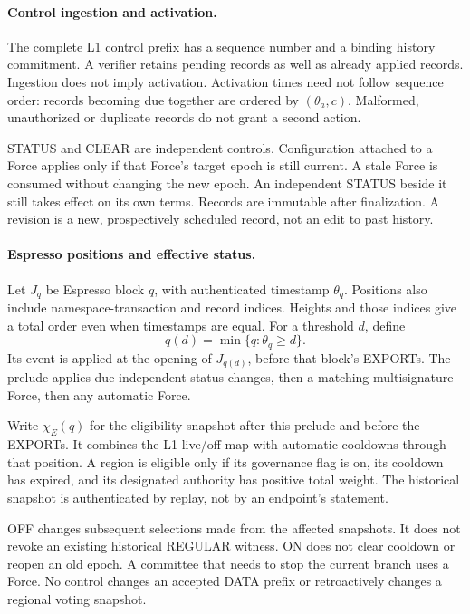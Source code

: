 \documentclass[11pt,a4paper]{article}
\begin{document}
\paragraph{Control ingestion and activation.}
The complete L1 control prefix has a sequence number and a binding
history commitment. A verifier retains pending records as well as
already applied records. Ingestion does not imply activation.
Activation times need not follow sequence order: records becoming due
together are ordered by $(\theta_a,c)$. Malformed, unauthorized or
duplicate records do not grant a second action.

STATUS and CLEAR are independent controls. Configuration attached to
a Force applies only if that Force's target epoch is still current.
A stale Force is consumed without changing the new epoch. An independent
STATUS beside it still takes effect on its own terms.
Records are immutable after finalization. A revision is a new,
prospectively scheduled record, not an edit to past history.

\paragraph{Espresso positions and effective status.}
Let $J_q$ be Espresso block $q$, with authenticated timestamp
$\theta_q$. Positions also include namespace-transaction and record
indices. Heights and those indices give a total order even when
timestamps are equal. For a threshold $d$, define
\[
 q(d)=\min\{q:\theta_q\ge d\}.
\]
Its event is applied at the opening of $J_{q(d)}$, before that block's
EXPORTs. The prelude applies due independent status changes, then a
matching multisignature Force, then any automatic Force.

Write $\chi_E(q)$ for the eligibility snapshot after this prelude and
before the EXPORTs. It combines the L1 live/off map with automatic
cooldowns through that position. A region is eligible only if its
governance flag is on, its cooldown has expired, and its designated
authority has positive total weight. The historical snapshot is
authenticated by replay, not by an endpoint's statement.

OFF changes subsequent selections made from the affected snapshots.
It does not revoke an existing historical REGULAR witness. ON does not
clear cooldown or reopen an old epoch. A committee that needs to stop
the current branch uses a Force. No control changes an accepted DATA
prefix or retroactively changes a regional voting snapshot.
\end{document}
